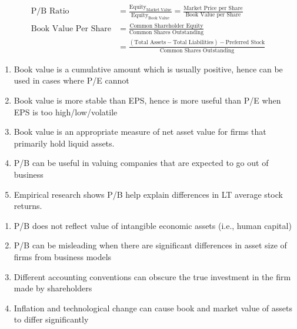 \begin{definition} 
\begin{align}
\text{P/B Ratio} &= \frac{\text{Equity}_{\text{Market Value}}}{\text{Equity}_{\text{Book Value}}} = \frac{\text{Market Price per Share}}{\text{Book Value per Share}} \nonumber \\
\text{Book Value Per Share} &= \frac{\text{Common Shareholder Equity}}{\text{Common Shares Outstanding}} \nonumber \\
&= \frac{(\text{Total Assets} - \text{Total Liabilities}) - \text{Preferred Stock}}{\text{Common Shares Outstanding}} \nonumber
\end{align}
\end{definition}

\begin{remark} 
\begin{enumerate}[label=\roman*.]
\setlength{\itemsep}{0pt}
\item Book value is a cumulative amount which is usually positive, hence can be used in cases where P/E cannot
\item Book value is more stable than EPS, hence is more useful than P/E when EPS is too high/low/volatile
\item Book value is an appropriate measure of net asset value for firms that primarily hold liquid assets.
\item P/B can be useful in valuing companies that are expected to go out of business
\item Empirical research shows P/B help explain differences in LT average stock returns.
\end{enumerate}
\end{remark}

\begin{remark} 
\begin{enumerate}[label=\roman*.]
\setlength{\itemsep}{0pt}
\item P/B does not reflect value of intangible economic assets (i.e., human capital)
\item P/B can be misleading when there are significant differences in asset size of firms from business models
\item Different accounting conventions can obscure the true investment in the firm made by shareholders
\item Inflation and technological change can cause book and market value of assets to differ significantly
\end{enumerate}
\end{remark}

